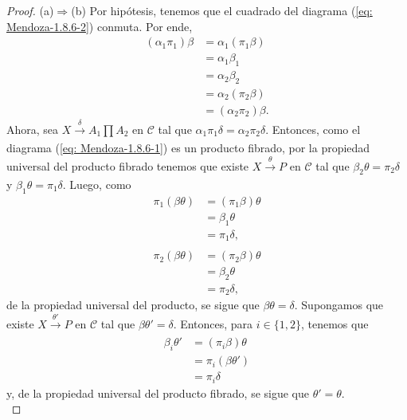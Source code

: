 \documentclass[tesis]{subfiles}
\begin{document}
\begin{proof}\leavevmode

    (a)$\Rightarrow$(b) Por hipótesis, tenemos que el cuadrado del diagrama (\ref{eq: Mendoza-1.8.6-2}) conmuta. Por ende,
    \begin{align*}
        (\alpha_1\pi_1)\beta &= \alpha_1(\pi_1\beta) \\
                             &= \alpha_1\beta_1 \\
                             &= \alpha_2\beta_2 \\
                             &= \alpha_2(\pi_2\beta) \\
                             &= (\alpha_2\pi_2)\beta.
    \end{align*}
    Ahora, sea $X\xrightarrow[]{\delta}A_1\prod A_2$ en $\mathscr{C}$ tal que $\alpha_1\pi_1\delta = \alpha_2\pi_2\delta$. Entonces, como el diagrama (\ref{eq: Mendoza-1.8.6-1}) es un producto fibrado, por la propiedad universal del producto fibrado tenemos que existe $X\xrightarrow[]{\theta}P$ en $\mathscr{C}$ tal que $\beta_2\theta = \pi_2\delta$ y $\beta_1\theta = \pi_1\delta$. Luego, como
    \begin{align*}
        \pi_1(\beta\theta) &= (\pi_1\beta)\theta \\
                           &= \beta_1\theta \\
                           &= \pi_1\delta, \\ \\
        \pi_2(\beta\theta) &= (\pi_2\beta)\theta \\
                           &= \beta_2\theta \\
                           &= \pi_2\delta,
    \end{align*}
    de la propiedad universal del producto, se sigue que $\beta\theta=\delta$. Supongamos que existe $X\xrightarrow[]{\theta'} P$ en $\mathscr{C}$ tal que $\beta\theta' = \delta$. Entonces, para $i\in\{1,2\}$, tenemos que
    \begin{align*}
        \beta_i\theta' &= (\pi_i\beta)\theta \\
                       &= \pi_i(\beta\theta') \\
                       &= \pi_i\delta
    \end{align*}
    y, de la propiedad universal del producto fibrado, se sigue que $\theta'=\theta$. \\


\end{proof}
\end{document}
